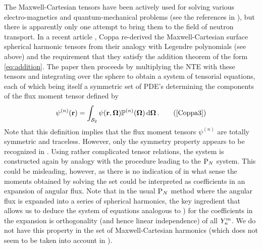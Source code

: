 The Maxwell-Cartesian tensors have been actively used for solving various electro-magnetics and quantum-mechanical
problems (see the references in \cite{Applequist2}), but there is apparently only one attempt to bring them to the field
of neutron transport. In a recent article \cite{Coppa3}, Coppa re-derived the Maxwell-Cartesian surface spherical
harmonic tensors from their analogy with Legendre polynomials (see above) and the requirement that they satisfy the
addition theorem of the form \eqref{eq:addition}. The paper then proceeds by multiplying the NTE with these tensors and
integrating over the sphere to obtain a system of tensorial equations, each of which being itself a symmetric set of
PDE's determining the components of the flux moment tensor defined by
\begin{equation*}
  \psi^{(n)}(\br) = \intA{\psi(\br,\bomega)\PP[n](\bomega)}.\tag{\cite[Eqn. (41)]{Coppa3}}
\end{equation*}
Note that this definition implies that the flux moment tensors $\psi^{(n)}$ are totally symmetric and traceless. 
However, only the symmetry property appears to be recognized in \cite{Coppa3}. Using rather complicated tensor
relations, the system is constructed again by analogy with the procedure leading to the $\text{P}_{N}$ system. This could be
misleading, however, as there is no indication of in what sense the moments obtained by solving the set could be
interpreted as coefficients in an expansion of angular flux. Note that in the usual $\text{P}_{N}$ method where the angular flux 
is expanded into a series of spherical harmonics, the key ingredient that allows us to deduce 
the system of equations analogous to \cite[Eqn. (48)]{Coppa3}) for the coefficients in the expansion is orthogonality 
(and hence linear independence) of all $Y_{n}^{m}$. We do not have this property in the set of Maxwell-Cartesian 
harmonics (which does not seem to be taken into account in \cite{Coppa3}). 

